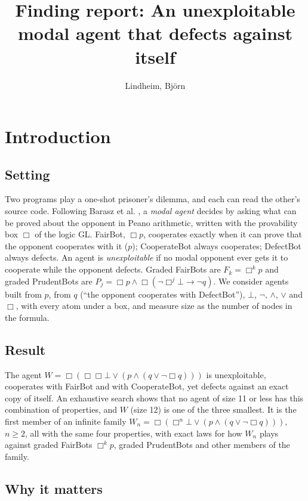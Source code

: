 \documentclass{article}
\title{Finding report: An unexploitable modal agent that defects against itself}
\author{Lindheim, Björn}
\date{}
\begin{document}
\maketitle
\section{Introduction}
\label{sec:wn-gate-family}

\subsection*{Setting}

Two programs play a one-shot prisoner's dilemma, and each can read the other's source code.
Following Barasz et al. \cite{barasz2014robust}, a \emph{modal agent} decides by asking what can be proved about the
opponent in Peano arithmetic, written with the provability box $\Box$ of the logic GL. FairBot,
$\Box p$, cooperates exactly when it can prove that the opponent cooperates with it
($p$); CooperateBot always cooperates; DefectBot always defects. An agent is \emph{unexploitable} if
no modal opponent ever gets it to cooperate while the opponent defects. Graded FairBots are $F_k = \Box^k p$ and graded PrudentBots are
$P_j = \Box p \wedge \Box(\neg\Box^j\bot \to \neg q)$. We consider agents
built from $p$, from $q$ (``the opponent cooperates with DefectBot''), $\bot$, $\neg$, $\wedge$,
$\vee$ and $\Box$, with every atom under a box, and measure size as the number of nodes in the
formula.

\subsection*{Result}

The agent $W = \Box(\Box\Box\bot \vee (p \wedge (q \vee \neg\Box q)))$ is unexploitable,
cooperates with FairBot and with CooperateBot, yet defects against an exact copy of itself. An
exhaustive search shows that no agent of size 11 or less has this combination of properties, and
$W$ (size 12) is one of the three smallest. It is the first member of an infinite family
$W_n = \Box(\Box^n\bot \vee (p \wedge (q \vee \neg\Box q)))$, $n \ge 2$, all with the same four
properties, with exact laws for how $W_n$ plays against graded FairBots $\Box^k p$, graded
PrudentBots and other members of the family.

\subsection*{Why it matters}
\end{document}
